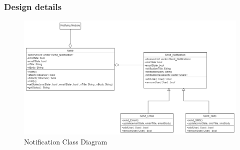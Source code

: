 \documentclass{article}
\begin{document}
\clearpage

\subsubsection{Design details}
   
    \begin{figure}[h!]
      \includegraphics[width=\textwidth]{Notifications/img/Notifications_Class_Diagram.png}\caption{Notification Class Diagram}
    \end{figure}
    
\end{document}
